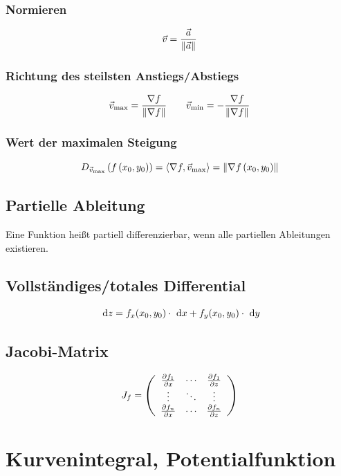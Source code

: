 \documentclass[main.tex]{subfiles}
\begin{document}
\subsubsection{Normieren}
\[
    \vec{v} = \frac{\vec{a}}{\norm*{\vec{a}}}
\]
\subsubsection{Richtung des steilsten Anstiegs/Abstiegs}
\[
    \vec{v}_{\text{max}} = \frac{\nabla f}{\norm*{\nabla f}}
    \qquad
    \vec{v}_{\text{min}} = - \frac{\nabla f}{\norm*{\nabla f}}
\]
\subsubsection{Wert der maximalen Steigung}
\[
    D_{\vec{v}_{\text{max}}}\left(f\left(x_0, y_0\right)\right)
    = \scalarprod*{\nabla f, \vec{v}_{\text{max}}}
    = \norm*{\nabla f\left(x_0, y_0\right)}
\]

\subsection{Partielle Ableitung}
Eine Funktion heißt partiell differenzierbar, wenn alle partiellen Ableitungen existieren.

\subsection{Vollständiges/totales Differential}
\[
    \dx{z} = f_x (x_0, y_0)\cdot \dx{x} + f_y(x_0, y_0)\cdot \dx{y}
\]

\subsection{Jacobi-Matrix}
\[
    J_f = \eqmatrix{ccc}{
        \frac{\partial f_1}{\partial x} & \cdots & \frac{\partial f_1}{\partial z} \\
        \vdots & \ddots & \vdots \\
        \frac{\partial f_n}{\partial x} & \cdots & \frac{\partial f_n}{\partial z} \\
    }
\]



\section{Kurvenintegral, Potentialfunktion}
\end{document}
